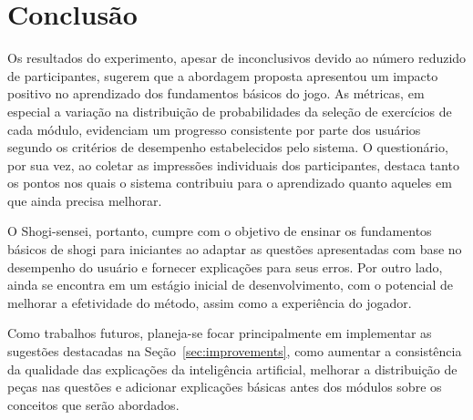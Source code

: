 
\chapter{Conclusão}
\label{cap:conclusao}
Os resultados do experimento, apesar de inconclusivos devido ao número reduzido de participantes, sugerem que a abordagem proposta apresentou um impacto positivo
no aprendizado dos fundamentos básicos do jogo. As métricas, em especial a variação na distribuição de probabilidades da seleção de exercícios de cada módulo,
evidenciam um progresso consistente por parte dos usuários segundo os critérios de desempenho estabelecidos pelo sistema. O questionário, por sua vez, ao coletar 
as impressões individuais dos participantes, destaca tanto os pontos nos quais o sistema contribuiu para o aprendizado quanto aqueles em que ainda precisa melhorar. 

O Shogi-sensei, portanto, cumpre com o objetivo de ensinar os fundamentos básicos de shogi para iniciantes ao adaptar as questões apresentadas com base no desempenho
do usuário e fornecer explicações para seus erros. Por outro lado, ainda se encontra em um estágio inicial de desenvolvimento, com o potencial de melhorar a 
efetividade do método, assim como a experiência do jogador.

Como trabalhos futuros, planeja-se focar principalmente em implementar as sugestões destacadas na Seção~\ref{sec:improvements}, como aumentar a consistência da
qualidade das explicações da inteligência artificial, melhorar a distribuição de peças nas questões e adicionar explicações básicas antes dos módulos sobre os
conceitos que serão abordados.



